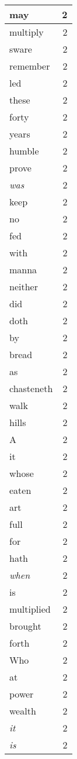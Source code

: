 \begin{center}
\begin{longtable}{l|r}
may & 2 \\ \hline
multiply & 2 \\ \hline
sware & 2 \\ \hline
remember & 2 \\ \hline
led & 2 \\ \hline
these & 2 \\ \hline
forty & 2 \\ \hline
years & 2 \\ \hline
humble & 2 \\ \hline
prove & 2 \\ \hline
\emph{was} & 2 \\ \hline
keep & 2 \\ \hline
no & 2 \\ \hline
fed & 2 \\ \hline
with & 2 \\ \hline
manna & 2 \\ \hline
neither & 2 \\ \hline
did & 2 \\ \hline
doth & 2 \\ \hline
by & 2 \\ \hline
bread & 2 \\ \hline
as & 2 \\ \hline
chasteneth & 2 \\ \hline
walk & 2 \\ \hline
hills & 2 \\ \hline
A & 2 \\ \hline
it & 2 \\ \hline
whose & 2 \\ \hline
eaten & 2 \\ \hline
art & 2 \\ \hline
full & 2 \\ \hline
for & 2 \\ \hline
hath & 2 \\ \hline
\emph{when} & 2 \\ \hline
is & 2 \\ \hline
multiplied & 2 \\ \hline
brought & 2 \\ \hline
forth & 2 \\ \hline
Who & 2 \\ \hline
at & 2 \\ \hline
power & 2 \\ \hline
wealth & 2 \\ \hline
\emph{it} & 2 \\ \hline
\emph{is} & 2 \\ \hline

\end{longtable}
\end{center}
